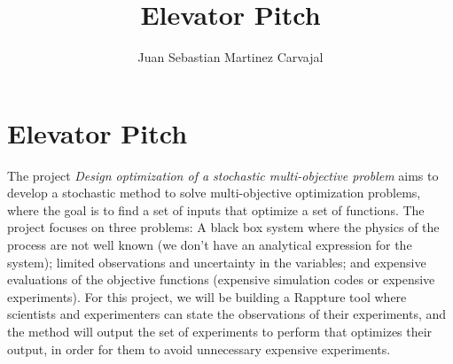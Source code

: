 \documentclass[12pt,a4paper]{journal}
\title{Elevator Pitch}
\author{Juan Sebastian Martinez Carvajal}
\date{}
\begin{document}
\maketitle
\hrulefill
\section{Elevator Pitch}
The project \textit{Design optimization of a stochastic multi-objective problem} aims to develop a stochastic method to solve multi-objective optimization problems, where the goal is to find a set of inputs that optimize a set of functions. The project focuses on three problems: A black box system where the physics of the process are not well known (we don't have an analytical expression for the system); limited observations and uncertainty in the variables; and expensive evaluations of the objective functions (expensive simulation codes or expensive experiments). For this project, we will be building a Rappture tool where scientists and experimenters can state the observations of their experiments, and the method will output the set of experiments to perform that optimizes their output, in order for them to avoid unnecessary expensive experiments.
\end{document}
